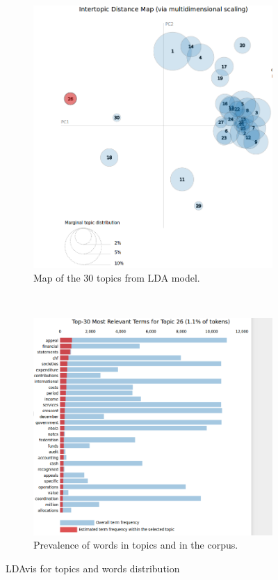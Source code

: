 \begin{figure}[h!]
    \centering
    \begin{subfigure}[h]{0.60\textwidth}
        \includegraphics[width=\textwidth]{c4_5.png}
        \caption{Map of the 30 topics from LDA model.}
        \label{fig:trapez1}
    \end{subfigure}
    ~ %
    \begin{subfigure}[h]{0.60\textwidth}
        \includegraphics[width=\textwidth]{c4_6.png}
        \caption{Prevalence of words in topics and in the corpus.}
        \label{fig:trapez2}
    \end{subfigure}
    \caption{LDAvis for topics and words distribution}\label{figure 4.5}
\end{figure}
